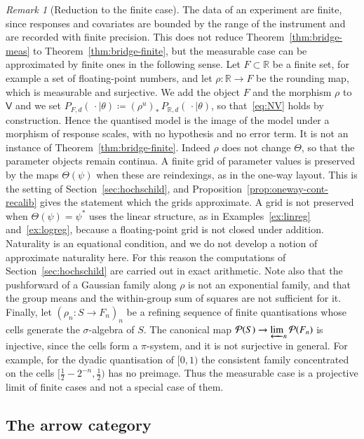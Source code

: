 \documentclass[11pt,a4paper]{article}
\theoremstyle{plain}
\theoremstyle{definition}
\theoremstyle{remark}
\newtheorem{remark}[theorem]{Remark}
\newcommand{\cat}[1]{\mathsf{#1}}
\newcommand{\catV}{\cat{V}}
\newcommand{\Prb}{\mathcal{P}}
\newcommand{\R}{\mathbb{R}}
\begin{document}
\begin{remark}[Reduction to the finite case]\label{rem:reduction}
The data of an experiment are finite, since responses and covariates are
bounded by the range of the instrument and are recorded with finite precision.
This does not reduce Theorem~\ref{thm:bridge-meas} to
Theorem~\ref{thm:bridge-finite}, but the measurable case can be approximated by
finite ones in the following sense. Let $F \subset \R$ be a finite set, for
example a set of floating-point numbers, and let $\rho \colon \R \to F$ be the
rounding map, which is measurable and surjective. We add the object $F$ and the
morphism $\rho$ to $\catV$ and we set
$P_{F,d}(\,\cdot \mid \theta) \coloneqq (\rho^{u})_{*}\,P_{\R,d}(\,\cdot \mid
\theta)$, so that~\eqref{eq:NV} holds by construction. Hence the quantised
model is the image of the model under a morphism of response scales, with no
hypothesis and no error term. It is not an instance of
Theorem~\ref{thm:bridge-finite}. Indeed $\rho$ does not change $\Theta$, so
that the parameter objects remain continua. A finite grid of parameter values
is preserved by the maps $\Theta(\psi)$ when these are reindexings, as in the
one-way layout. This is the setting of Section~\ref{sec:hochschild}, and
Proposition~\ref{prop:oneway-cont-recalib} gives the statement which the grids
approximate. A grid is not preserved when $\Theta(\psi) = \psi^{*}$ uses the
linear structure, as in Examples~\ref{ex:linreg} and~\ref{ex:logreg}, because a
floating-point grid is not closed under addition. Naturality is an equational
condition, and we do not develop a notion of approximate naturality here. For
this reason the computations of Section~\ref{sec:hochschild} are carried out in
exact arithmetic. Note also that the pushforward of a Gaussian family along
$\rho$ is not an exponential family, and that the group means and the
within-group sum of squares are not sufficient for it. Finally, let
$(\rho_n \colon S \to F_n)_{n}$ be a refining sequence of finite quantisations
whose cells generate the $\sigma$-algebra of $S$. The canonical map
$\Prb(S) \to \varprojlim_n \Prb(F_n)$ is injective, since the cells form a
$\pi$-system, and it is not surjective in general. For example, for the dyadic
quantisation of $[0,1)$ the consistent family concentrated on the cells
$[\tfrac12 - 2^{-n}, \tfrac12)$ has no preimage. Thus the measurable case is a
projective limit of finite cases and not a special case of them.
\end{remark}

\subsection{The arrow category}
\end{document}
